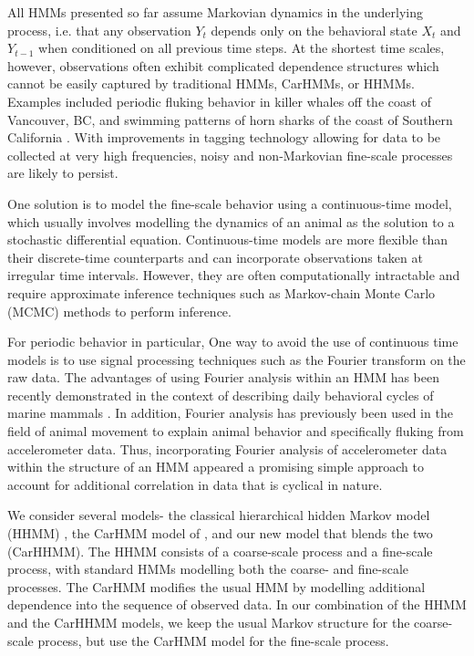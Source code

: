 All HMMs presented so far assume Markovian dynamics in the underlying process, i.e. that any observation $Y_t$ depends only on the behavioral state $X_t$ and $Y_{t-1}$ when conditioned on all previous time steps. At the shortest time scales, however, observations often exhibit complicated dependence structures which cannot be easily captured by traditional HMMs, CarHMMs, or HHMMs. Examples included periodic fluking behavior in killer whales off the coast of Vancouver, BC, and swimming patterns of horn sharks of the coast of Southern California \citep{Adam:2019}.  With improvements in tagging technology allowing for data to be collected at very high frequencies, noisy and non-Markovian fine-scale processes are likely to persist.

One solution is to model the fine-scale behavior using a continuous-time model, which usually involves modelling the dynamics of an animal as the solution to a stochastic differential equation. Continuous-time models are more flexible than their discrete-time counterparts and can incorporate observations taken at irregular time intervals. However, they are often computationally intractable and require approximate inference techniques such as Markov-chain Monte Carlo (MCMC) methods to perform inference.

For periodic behavior in particular, One way to avoid the use of continuous time models is to use signal processing techniques such as the Fourier transform on the raw data. The advantages of using Fourier analysis within an HMM has been recently demonstrated in the context of describing daily behavioral cycles of marine mammals \citep{Heerah:2017}. In addition, Fourier analysis has previously been used in the field of animal movement to explain animal behavior \citep{Fehlmann:2017} and specifically fluking \citep{Shorter:2017} from accelerometer data. Thus, incorporating Fourier analysis of accelerometer data within the structure of an HMM appeared a promising simple approach to account for additional correlation in data that is cyclical in nature.

We consider several models- the classical hierarchical hidden Markov model (HHMM) \citep{Barajas:2017}, the CarHMM model of \citep{Lawler:2019}, and our new model that blends the two (CarHHMM). The HHMM consists of a coarse-scale process and a fine-scale process, with standard HMMs modelling both the coarse- and fine-scale processes. The CarHMM modifies the usual HMM by modelling additional dependence into the sequence of observed data. In our combination of the HHMM and the CarHHMM models, we keep the usual Markov structure for the coarse-scale process, but use the CarHMM model for the fine-scale process.

